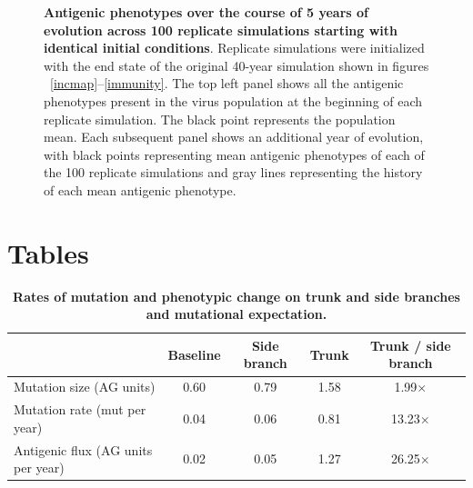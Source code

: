\documentclass[11pt,oneside,letterpaper]{article}
\begin{document}
\begin{figure}[H]
	\centering
	\caption{\textbf{Antigenic phenotypes over the course of 5 years of evolution across 100 replicate simulations starting with identical initial conditions}.  Replicate simulations were initialized with the end state of the original 40-year simulation shown in figures ~\ref{incmap}--\ref{immunity}.  The top left panel shows all the antigenic phenotypes present in the virus population at the beginning of each replicate simulation.  The black point represents the population mean.  Each subsequent panel shows an additional year of evolution, with black points representing mean antigenic phenotypes of each of the 100 replicate simulations and gray lines representing the history of each mean antigenic phenotype.}
	\label{replicateevol}
\end{figure}

\section*{Tables}


\begin{table}[H]
	\centering
	\caption{\textbf{Rates of mutation and phenotypic change on trunk and side branches and mutational expectation.}}
	\label{mktable}
	\begin{tabular}{ l c c c c } 
	\hline
		 								& Baseline 	& Side branch 	& Trunk		& Trunk / side branch \\
	\hline				
	Mutation size (AG units)			& 0.60		& 0.79			& 1.58		& 1.99$\times$ \\
	Mutation rate (mut per year)		& 0.04		& 0.06			& 0.81		& 13.23$\times$ \\	
	Antigenic flux (AG units per year)	& 0.02		& 0.05			& 1.27		& 26.25$\times$ \\		
	\hline
	\end{tabular}
\end{table}
\end{document}
